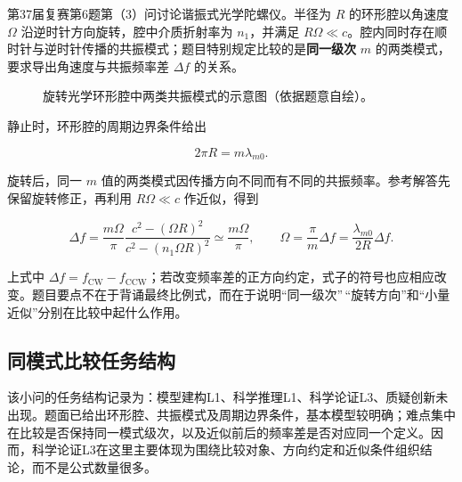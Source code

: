 \documentclass[
  12pt,
  a4paper]{ctexbook}
\begin{document}
第37届复赛第6题第（3）问讨论谐振式光学陀螺仪。半径为 \(R\)
的环形腔以角速度 \(\Omega\) 沿逆时针方向旋转，腔中介质折射率为
\(n_1\)，并满足
\(R\Omega\ll c\)。腔内同时存在顺时针与逆时针传播的共振模式；题目特别规定比较的是\textbf{同一级次}
\(m\) 的两类模式，要求导出角速度与共振频率差 \(\Delta f\) 的关系。

\begin{figure}[H]
\centering
{}
\caption{旋转光学环形腔中两类共振模式的示意图（依据题意自绘）。}
\end{figure}

静止时，环形腔的周期边界条件给出

\[
2\pi R=m\lambda_{m0}.
\]

旋转后，同一 \(m\)
值的两类模式因传播方向不同而有不同的共振频率。参考解答先保留旋转修正，再利用
\(R\Omega\ll c\) 作近似，得到

\[
\Delta f
=\frac{m\Omega}{\pi}
 \frac{c^2-(\Omega R)^2}{c^2-(n_1\Omega R)^2}
\simeq\frac{m\Omega}{\pi},
\qquad
\Omega=\frac{\pi}{m}\Delta f
=\frac{\lambda_{m0}}{2R}\Delta f .
\]

上式中
\(\Delta f=f_{\mathrm{CW}}-f_{\mathrm{CCW}}\)；若改变频率差的正方向约定，式子的符号也应相应改变。题目要点不在于背诵最终比例式，而在于说明``同一级次''\,``旋转方向''和``小量近似''分别在比较中起什么作用。

\subsection{同模式比较任务结构}\label{ux540cux6a21ux5f0fux6bd4ux8f83ux4efbux52a1ux7ed3ux6784}

该小问的任务结构记录为：模型建构L1、科学推理L1、科学论证L3、质疑创新未出现。题面已给出环形腔、共振模式及周期边界条件，基本模型较明确；难点集中在比较是否保持同一模式级次，以及近似前后的频率差是否对应同一个定义。因而，科学论证L3在这里主要体现为围绕比较对象、方向约定和近似条件组织结论，而不是公式数量很多。
\end{document}
